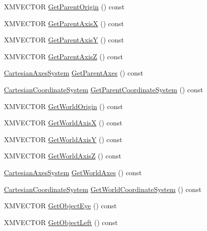 \begin{DoxyCompactItemize}
\item 
X\+M\+V\+E\+C\+T\+OR \hyperlink{structmage_1_1_transform_a4c33d968669e0342bdff3582825549ae}{Get\+Parent\+Origin} () const
\item 
X\+M\+V\+E\+C\+T\+OR \hyperlink{structmage_1_1_transform_afd81bb8bef70bebc59df3ff157d53bc9}{Get\+Parent\+AxisX} () const
\item 
X\+M\+V\+E\+C\+T\+OR \hyperlink{structmage_1_1_transform_a973c17d7d77c742f0b6d8fbdf5041128}{Get\+Parent\+AxisY} () const
\item 
X\+M\+V\+E\+C\+T\+OR \hyperlink{structmage_1_1_transform_a6b8002971da0bd9acbbd865c7325c860}{Get\+Parent\+AxisZ} () const
\item 
\hyperlink{structmage_1_1_cartesian_axes_system}{Cartesian\+Axes\+System} \hyperlink{structmage_1_1_transform_acdd8950649ae1a779c254da82136033a}{Get\+Parent\+Axes} () const
\item 
\hyperlink{structmage_1_1_cartesian_coordinate_system}{Cartesian\+Coordinate\+System} \hyperlink{structmage_1_1_transform_a3d6f03cda826eaf99a2d39e5c900fcbe}{Get\+Parent\+Coordinate\+System} () const
\item 
X\+M\+V\+E\+C\+T\+OR \hyperlink{structmage_1_1_transform_aad81c0c7af0f29bb3ead6c8112de262c}{Get\+World\+Origin} () const
\item 
X\+M\+V\+E\+C\+T\+OR \hyperlink{structmage_1_1_transform_ac7a718127c5212bb73d04302371473d0}{Get\+World\+AxisX} () const
\item 
X\+M\+V\+E\+C\+T\+OR \hyperlink{structmage_1_1_transform_a9c4452fa4aefb48e4e6c9a4a38fac32c}{Get\+World\+AxisY} () const
\item 
X\+M\+V\+E\+C\+T\+OR \hyperlink{structmage_1_1_transform_a580b65d46b4af8086fab60d0737fd353}{Get\+World\+AxisZ} () const
\item 
\hyperlink{structmage_1_1_cartesian_axes_system}{Cartesian\+Axes\+System} \hyperlink{structmage_1_1_transform_a580a4f9fd987259da0cf0355ade7fb4b}{Get\+World\+Axes} () const
\item 
\hyperlink{structmage_1_1_cartesian_coordinate_system}{Cartesian\+Coordinate\+System} \hyperlink{structmage_1_1_transform_a809600adbb284334d444ae8c50b17a1d}{Get\+World\+Coordinate\+System} () const
\item 
X\+M\+V\+E\+C\+T\+OR \hyperlink{structmage_1_1_transform_ac6808d885014b98c6920f8a770d3c7d4}{Get\+Object\+Eye} () const
\item 
X\+M\+V\+E\+C\+T\+OR \hyperlink{structmage_1_1_transform_a12946ff32c7044889f7c89c9182dba76}{Get\+Object\+Left} () const

\end{DoxyCompactItemize}
